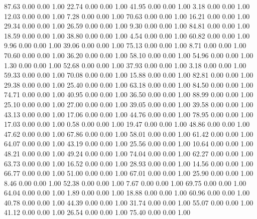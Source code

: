    87.63   0.00   0.00   1.00
   22.74   0.00   0.00   1.00
   41.95   0.00   0.00   1.00
    3.18   0.00   0.00   1.00
   12.03   0.00   0.00   1.00
    7.28   0.00   0.00   1.00
   70.63   0.00   0.00   1.00
   16.21   0.00   0.00   1.00
   29.34   0.00   0.00   1.00
   26.59   0.00   0.00   1.00
    9.30   0.00   0.00   1.00
   84.81   0.00   0.00   1.00
   18.59   0.00   0.00   1.00
   38.80   0.00   0.00   1.00
    4.54   0.00   0.00   1.00
   60.82   0.00   0.00   1.00
    9.96   0.00   0.00   1.00
   39.06   0.00   0.00   1.00
   75.13   0.00   0.00   1.00
    8.71   0.00   0.00   1.00
   70.60   0.00   0.00   1.00
   36.20   0.00   0.00   1.00
   58.10   0.00   0.00   1.00
   54.96   0.00   0.00   1.00
    1.30   0.00   0.00   1.00
   52.68   0.00   0.00   1.00
   37.93   0.00   0.00   1.00
    3.18   0.00   0.00   1.00
   59.33   0.00   0.00   1.00
   70.08   0.00   0.00   1.00
   15.88   0.00   0.00   1.00
   82.81   0.00   0.00   1.00
   29.38   0.00   0.00   1.00
   25.40   0.00   0.00   1.00
   63.18   0.00   0.00   1.00
   84.50   0.00   0.00   1.00
   74.71   0.00   0.00   1.00
   40.95   0.00   0.00   1.00
   36.50   0.00   0.00   1.00
   88.99   0.00   0.00   1.00
   25.10   0.00   0.00   1.00
   27.00   0.00   0.00   1.00
   39.05   0.00   0.00   1.00
   39.58   0.00   0.00   1.00
   43.13   0.00   0.00   1.00
   17.06   0.00   0.00   1.00
   44.76   0.00   0.00   1.00
   78.95   0.00   0.00   1.00
   17.03   0.00   0.00   1.00
    0.58   0.00   0.00   1.00
   19.47   0.00   0.00   1.00
   48.86   0.00   0.00   1.00
   47.62   0.00   0.00   1.00
   67.86   0.00   0.00   1.00
   58.01   0.00   0.00   1.00
   61.42   0.00   0.00   1.00
   64.07   0.00   0.00   1.00
   43.19   0.00   0.00   1.00
   25.56   0.00   0.00   1.00
   10.64   0.00   0.00   1.00
   48.21   0.00   0.00   1.00
   49.24   0.00   0.00   1.00
   74.04   0.00   0.00   1.00
   62.27   0.00   0.00   1.00
   63.73   0.00   0.00   1.00
   16.52   0.00   0.00   1.00
   28.93   0.00   0.00   1.00
   14.56   0.00   0.00   1.00
   66.77   0.00   0.00   1.00
   51.00   0.00   0.00   1.00
   67.01   0.00   0.00   1.00
   25.90   0.00   0.00   1.00
    8.46   0.00   0.00   1.00
   52.38   0.00   0.00   1.00
    7.67   0.00   0.00   1.00
   69.75   0.00   0.00   1.00
   64.04   0.00   0.00   1.00
    1.89   0.00   0.00   1.00
   18.88   0.00   0.00   1.00
   60.96   0.00   0.00   1.00
   40.78   0.00   0.00   1.00
   44.39   0.00   0.00   1.00
   31.74   0.00   0.00   1.00
   55.07   0.00   0.00   1.00
   41.12   0.00   0.00   1.00
   26.54   0.00   0.00   1.00
   75.40   0.00   0.00   1.00

